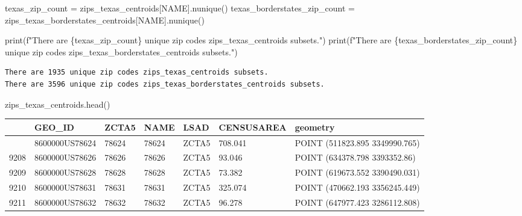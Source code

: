 \documentclass[
  letterpaper,
  DIV=11,
  numbers=noendperiod]{scrartcl}
\newenvironment{Shaded}{\begin{snugshade}}{\end{snugshade}}
\newcommand{\BuiltInTok}[1]{\textcolor[rgb]{0.00,0.23,0.31}{#1}}
\newcommand{\NormalTok}[1]{\textcolor[rgb]{0.00,0.23,0.31}{#1}}
\newcommand{\OperatorTok}[1]{\textcolor[rgb]{0.37,0.37,0.37}{#1}}
\newcommand{\SpecialCharTok}[1]{\textcolor[rgb]{0.37,0.37,0.37}{#1}}
\newcommand{\SpecialStringTok}[1]{\textcolor[rgb]{0.13,0.47,0.30}{#1}}
\newcommand{\StringTok}[1]{\textcolor[rgb]{0.13,0.47,0.30}{#1}}
\begin{document}
\begin{Shaded}
\begin{Highlighting}[]
\NormalTok{texas\_zip\_count }\OperatorTok{=}\NormalTok{ zips\_texas\_centroids[}\StringTok{\textquotesingle{}NAME\textquotesingle{}}\NormalTok{].nunique()}
\NormalTok{texas\_borderstates\_zip\_count }\OperatorTok{=}\NormalTok{ zips\_texas\_borderstates\_centroids[}\StringTok{\textquotesingle{}NAME\textquotesingle{}}\NormalTok{].nunique()}

\BuiltInTok{print}\NormalTok{(}\SpecialStringTok{f"There are }\SpecialCharTok{\{}\NormalTok{texas\_zip\_count}\SpecialCharTok{\}}\SpecialStringTok{ unique zip codes zips\_texas\_centroids subsets."}\NormalTok{)}
\BuiltInTok{print}\NormalTok{(}\SpecialStringTok{f"There are }\SpecialCharTok{\{}\NormalTok{texas\_borderstates\_zip\_count}\SpecialCharTok{\}}\SpecialStringTok{ unique zip codes zips\_texas\_borderstates\_centroids subsets."}\NormalTok{)}
\end{Highlighting}
\end{Shaded}

\begin{verbatim}
There are 1935 unique zip codes zips_texas_centroids subsets.
There are 3596 unique zip codes zips_texas_borderstates_centroids subsets.
\end{verbatim}

\begin{Shaded}
\begin{Highlighting}[]
\NormalTok{zips\_texas\_centroids.head()}
\end{Highlighting}
\end{Shaded}

\begin{longtable}[]{@{}lllllll@{}}
\toprule\noalign{}
& GEO\_ID & ZCTA5 & NAME & LSAD & CENSUSAREA & geometry \\
\midrule\noalign{}
\endhead
\bottomrule\noalign{}
\endlastfoot
9207 & 8600000US78624 & 78624 & 78624 & ZCTA5 & 708.041 & POINT
(511823.895 3349990.765) \\
9208 & 8600000US78626 & 78626 & 78626 & ZCTA5 & 93.046 & POINT
(634378.798 3393352.86) \\
9209 & 8600000US78628 & 78628 & 78628 & ZCTA5 & 73.382 & POINT
(619673.552 3390490.031) \\
9210 & 8600000US78631 & 78631 & 78631 & ZCTA5 & 325.074 & POINT
(470662.193 3356245.449) \\
9211 & 8600000US78632 & 78632 & 78632 & ZCTA5 & 96.278 & POINT
(647977.423 3286112.808) \\
\end{longtable}
\end{document}
